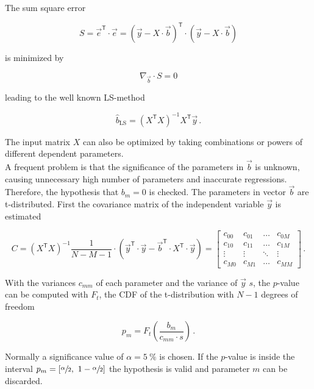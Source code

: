 The sum square error

\begin{equation}
S = \vec{e}^{\mathsf T}\cdot\vec{e}=\left(\vec{y}-X\cdot\vec{b}\right)^{\mathsf T}\cdot\left(\vec{y}-X\cdot\vec{b}\right)
\end{equation}

is minimized by 

\begin{equation}
\nabla_{\vec{b}}\cdot S = 0
\end{equation}

leading to the well known \ac{LS}-method

\begin{equation}
\hat{b}_\text{LS}=\left(X^{\mathsf T} X\right)^{-1} X^{\mathsf T}\vec{y}\,.
\end{equation}

The input matrix $X$ can also be optimized by taking combinations or powers of different dependent parameters.\\
A frequent problem is that the significance of the parameters in $\vec{b}$ is unknown, causing unnecessary high number of parameters and inaccurate regressions. Therefore, the hypothesis that $b_m=0$ is checked. The parameters in vector $\vec{b}$ are t-distributed. First the covariance matrix of the independent variable $\vec{y}$ is estimated \cite{dffs}

\begin{equation}
C = \left(X^{\mathsf T} X\right)^{-1}\frac{1}{N-M-1}\cdot\left(\vec{y}^{\mathsf T}\cdot\vec{y}-\vec{b}^{\mathsf T}\cdot X^{\mathsf T}\cdot \vec{y}\right) = \begin{bmatrix}
c_{00} & c_{01} & \dots & c_{0M} \\
c_{10} & c_{11} & \dots & c_{1M} \\
\vdots & \vdots & \ddots & \vdots \\
c_{M0} & c_{M1} & \dots & c_{MM}  
\end{bmatrix}\,.
\end{equation}

With the variances $c_{mm}$ of each parameter and the variance of $\vec{y}$ $s$, the $p$-value can be computed with $F_t$, the \ac{CDF} of the t-distribution with $N-1$ degrees of freedom

\begin{equation}
p_m = F_t\left(\frac{b_m}{c_{mm}\cdot s}\right)\,.
\end{equation}

Normally a significance value of $\alpha = \SI{5}{\percent}$ is chosen. If the $p$-value is inside the interval $p_m=\left[\sfrac{\alpha}{2},\ 1-\sfrac{\alpha}{2}\right]$ the hypothesis is valid and parameter $m$ can be discarded.

